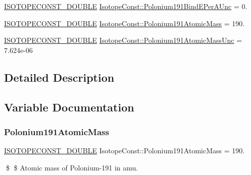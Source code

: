\begin{DoxyCompactItemize}
\mbox{\hyperlink{group___isotope_const-_macros_ga8f45a7272ce02c0b4c65c44636ed719a}{I\+S\+O\+T\+O\+P\+E\+C\+O\+N\+S\+T\+\_\+\+D\+O\+U\+B\+LE}} \mbox{\hyperlink{group___isotope_const-_polonium-_po191_gaa7f89499c98e8e6a7b77ec824dcff9e2}{Isotope\+Const\+::\+Polonium191\+Bind\+E\+Per\+A\+Unc}} = 0.
\item 
\mbox{\hyperlink{group___isotope_const-_macros_ga8f45a7272ce02c0b4c65c44636ed719a}{I\+S\+O\+T\+O\+P\+E\+C\+O\+N\+S\+T\+\_\+\+D\+O\+U\+B\+LE}} \mbox{\hyperlink{group___isotope_const-_polonium-_po191_gaf2abf71997859275cc13fcba620885a8}{Isotope\+Const\+::\+Polonium191\+Atomic\+Mass}} = 190.
\item 
\mbox{\hyperlink{group___isotope_const-_macros_ga8f45a7272ce02c0b4c65c44636ed719a}{I\+S\+O\+T\+O\+P\+E\+C\+O\+N\+S\+T\+\_\+\+D\+O\+U\+B\+LE}} \mbox{\hyperlink{group___isotope_const-_polonium-_po191_ga6971fe3ff906e28f473a17de02de0fa0}{Isotope\+Const\+::\+Polonium191\+Atomic\+Mass\+Unc}} = 7.\+624e-\/06
\end{DoxyCompactItemize}


\subsection{Detailed Description}


\subsection{Variable Documentation}
\mbox{\label{group___isotope_const-_polonium-_po191_gaf2abf71997859275cc13fcba620885a8}} 
\subsubsection{\texorpdfstring{Polonium191\+Atomic\+Mass}{Polonium191AtomicMass}}
{\footnotesize\ttfamily \mbox{\hyperlink{group___isotope_const-_macros_ga8f45a7272ce02c0b4c65c44636ed719a}{I\+S\+O\+T\+O\+P\+E\+C\+O\+N\+S\+T\+\_\+\+D\+O\+U\+B\+LE}} Isotope\+Const\+::\+Polonium191\+Atomic\+Mass = 190.}

\$ \$ Atomic mass of Polonium-\/191 in amu. \mbox{\label{group___isotope_const-_polonium-_po191_ga6971fe3ff906e28f473a17de02de0fa0}} 
